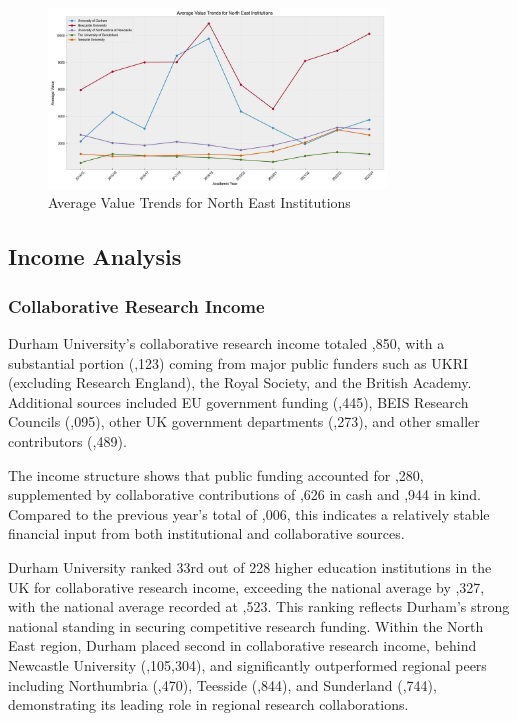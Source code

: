 \documentclass[journal,onecolumn, 10pt,draftclsnofoot]{IEEEtran}
\begin{document}
\begin{figure}[h]
\centering
\includegraphics[width=0.8\textwidth]{Fig/figure2.ne_institutions_trends.png}
\caption{Average Value Trends for North East Institutions}
\label{fig:institutions-trends}
\end{figure}

\subsection{Income Analysis}

\subsubsection{Collaborative Research Income}

Durham University's collaborative research income totaled ,850, with a substantial portion (,123) coming from major public funders such as UKRI (excluding Research England), the Royal Society, and the British Academy. Additional sources included EU government funding (,445), BEIS Research Councils (,095), other UK government departments (,273), and other smaller contributors (,489).

The income structure shows that public funding accounted for ,280, supplemented by collaborative contributions of ,626 in cash and ,944 in kind. Compared to the previous year's total of ,006, this indicates a relatively stable financial input from both institutional and collaborative sources.

Durham University ranked 33rd out of 228 higher education institutions in the UK for collaborative research income, exceeding the national average by ,327, with the national average recorded at ,523. This ranking reflects Durham's strong national standing in securing competitive research funding. Within the North East region, Durham placed second in collaborative research income, behind Newcastle University (,105,304), and significantly outperformed regional peers including Northumbria (,470), Teesside (,844), and Sunderland (,744), demonstrating its leading role in regional research collaborations.
\end{document}

